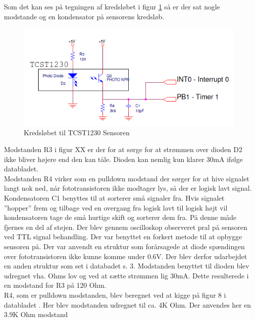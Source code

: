 Som det kan ses på tegningen af kredsløbet i figur \ref{wheelspeedTegning} så er der sat nogle modstande og en kondensator på sensorens kredsløb. \\

\begin{figure}[h!]
\center
\includegraphics[scale=0.65]{./Graphics/TCST1230}
\caption{Kredsløbet til TCST1230 Sensoren}
\label{wheelspeedTegning}
\end{figure}

Modstanden R3 i figur XX  er der for at sørge for at strømmen over dioden D2 ikke bliver højere end den kan tåle. Dioden kan nemlig kun klarer 30mA ifølge databladet. \\

Modstanden R4 virker som en pulldown modstand der sørger for at hive signalet langt nok ned, når fototransistoren ikke modtager lys, så der er logisk lavt signal. \\

Kondensatoren C1 benyttes til at sorterer små signaler fra. Hvis signalet ”hopper” frem og tilbage ved en overgang fra logisk lavt til logisk højt vil kondensatoren tage de små hurtige skift og sorterer dem fra. På denne måde fjernes en del af støjen.  
Der blev gennem oscilloskop observeret pral på sensoren ved TTL signal behandling. Der var benyttet en forkert metode til at opbygge sensoren på. Der var anvendt en struktur som forårsagede at diode spændingen over fototransistoren ikke kunne komme under 0.6V. Der blev derfor udarbejdet en anden struktur som set i databadet s. 3.  Modstanden benyttet til dioden blev udregnet vha. Ohms lov og ved at sætte strømmen lig 30mA. Dette resulterede i en modstand for R3 på 120 Ohm. \\

R4, som er pulldown modstanden, blev beregnet ved at kigge på figur 8 i databladet . Her blev modstanden udregnet til ca. 4K Ohm. Der anvendes her en 3.9K Ohm modstand \\

